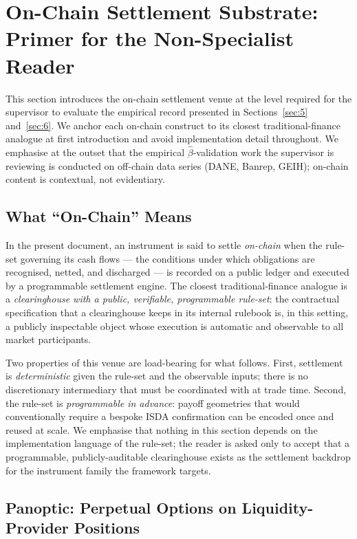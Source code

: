 \section{On-Chain Settlement Substrate: Primer for the Non-Specialist Reader}\label{sec:4}

This section introduces the on-chain settlement venue at the level required for
the supervisor to evaluate the empirical record presented in Sections~\ref{sec:5}
and~\ref{sec:6}. We anchor each on-chain construct to its closest
traditional-finance analogue at first introduction and avoid implementation
detail throughout. We emphasise at the outset that the empirical
\(\hat{\beta}\)-validation work the supervisor is reviewing is conducted on
off-chain data series (DANE, Banrep, GEIH); on-chain content is contextual,
not evidentiary.

\subsection{What ``On-Chain'' Means}\label{sec:4-onchain-meaning}

In the present document, an instrument is said to settle \emph{on-chain} when
the rule-set governing its cash flows --- the conditions under which obligations
are recognised, netted, and discharged --- is recorded on a public ledger and
executed by a programmable settlement engine. The closest traditional-finance
analogue is a \emph{clearinghouse with a public, verifiable, programmable
rule-set}: the contractual specification that a clearinghouse keeps in its
internal rulebook is, in this setting, a publicly inspectable object whose
execution is automatic and observable to all market participants.

Two properties of this venue are load-bearing for what follows. First,
settlement is \emph{deterministic} given the rule-set and the observable inputs;
there is no discretionary intermediary that must be coordinated with at trade
time. Second, the rule-set is \emph{programmable in advance}: payoff geometries
that would conventionally require a bespoke ISDA confirmation can be encoded once
and reused at scale. We emphasise that nothing in this section depends on the
implementation language of the rule-set; the reader is asked only to accept that
a programmable, publicly-auditable clearinghouse exists as the settlement
backdrop for the instrument family the framework targets.

\subsection{Panoptic: Perpetual Options on Liquidity-Provider Positions}\label{sec:4-panoptic}

